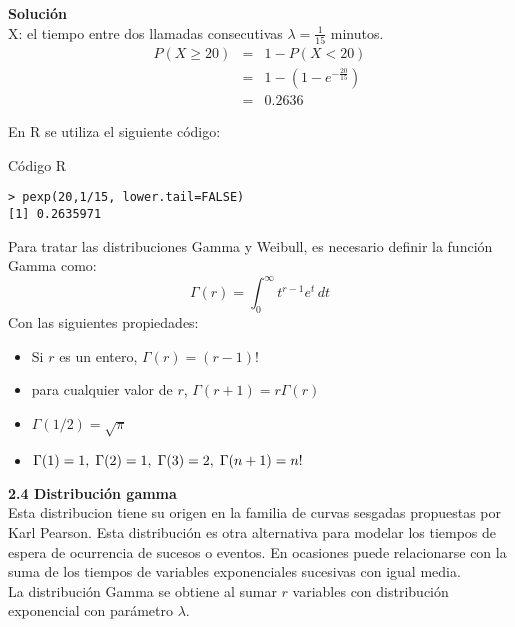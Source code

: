 \documentclass[base=hide,12pt]{elegantbook}
\begin{document}
\textcolor{col3}{\bf \large Solución}\\
X: el tiempo entre dos llamadas consecutivas $\lambda=\frac{1}{15}$ minutos. 
\begin{eqnarray}
	P(X \geq 20) &=& 1-P(X < 20) \\
	&=& 1-(1-e^{-\frac{20}{15}}) \\
	&=& 0.2636 
\end{eqnarray}

En R se utiliza el siguiente código: 

\begin{Box3}{Código R }
\begin{verbatim}
> pexp(20,1/15, lower.tail=FALSE)
[1] 0.2635971
\end{verbatim}
 \end{Box3}

\vspace{1cm}
Para tratar las distribuciones Gamma y Weibull, es necesario definir la función Gamma como:
$$\Gamma(r)= \int_{0}^{\infty} t^{r-1} e^{t} \,dt $$
Con las siguientes propiedades:
\begin{itemize}
	\item Si $r$ es un entero, $\Gamma(r)=(r-1)!$
	\item para cualquier valor de $r$, $\Gamma(r+1)=r \Gamma(r)$
	\item $\Gamma(1/2)=\sqrt{\pi}$
	\item $\Gamma(1)=1,\hspace{.1cm} \Gamma(2)=1, \hspace{.1cm} \Gamma(3)=2, \hspace{.1cm}\Gamma(n+1)=n!$
\end{itemize}

\vspace{1cm}
\textcolor{col4}{\LARGE  \bf 2.4 Distribución gamma}\\

Esta distribucion tiene su origen en la familia de curvas sesgadas propuestas por Karl Pearson. Esta distribución es otra alternativa para modelar los tiempos de espera de ocurrencia de sucesos o eventos. En ocasiones puede relacionarse con la suma de los tiempos de variables exponenciales sucesivas con igual media.\\


La distribución Gamma se obtiene al sumar $r$ variables con distribución exponencial con parámetro $\lambda$. 
\end{document}
